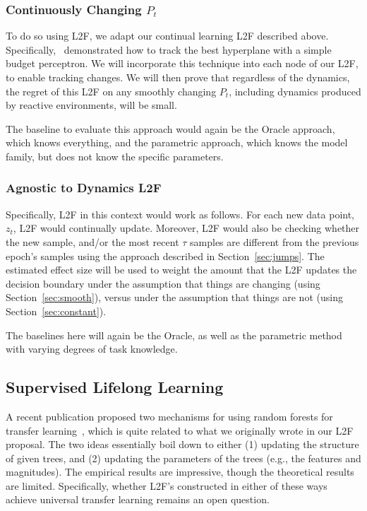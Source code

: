 \documentclass{article}
\begin{document}
\subsubsection*{Continuously Changing $P_t$}

To do so using L2F, we adapt our continual learning L2F described above.  Specifically,~\citet{Cavallanti2007-sv} demonstrated how to track the best hyperplane with a simple budget perceptron.  We will incorporate this technique into each node of our L2F, to enable tracking changes. We will then prove that regardless of the dynamics, the regret of this L2F on any smoothly changing $P_t$, including dynamics produced by reactive environments, will be small.  

The baseline to evaluate this approach would again be the Oracle approach, which knows everything, and the parametric approach, which knows the model family, but does not know the specific parameters. 

\subsubsection*{Agnostic to Dynamics L2F}


Specifically, L2F in this context would work as follows.  For each new data point, $z_t$, L2F would continually update.  Moreover, L2F would also be checking whether the new sample, and/or the most recent $\tau$ samples are different from the previous epoch's samples using the approach described in Section~\ref{sec:jumps}.  The estimated effect size will be used to weight the amount that the L2F updates the decision boundary under the assumption that things are changing (using Section~\ref{sec:smooth}), versus under the assumption that things are not (using Section~\ref{sec:constant}).  

The baselines here will again be the Oracle, as well as the parametric method with varying degrees of task knowledge. 


\subsection{Supervised Lifelong Learning}

A recent publication proposed two mechanisms for using random forests for transfer learning~\cite{Segev2016-pu}, which is quite related to what we originally wrote in our L2F proposal. The two ideas essentially boil down to either (1) updating the structure of given trees, and (2) updating the parameters of the trees (e.g., the features and magnitudes).  The empirical results are impressive, though the theoretical results are limited.  Specifically, whether L2F's constructed in either of these ways achieve universal transfer learning remains an open question.  
\end{document}
